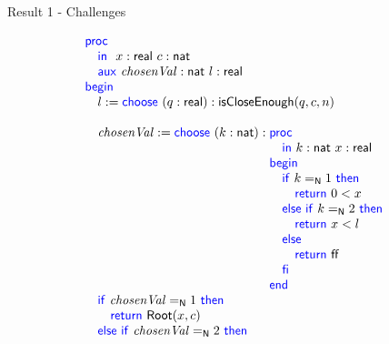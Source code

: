 \begin{frame}{Result 1 - Challenges}
\begin{minipage}[t]{0.4\linewidth}
        \pause
    \end{minipage}
    \begin{minipage}[t]{0.50\linewidth}
        \pause
        {
        \vspace{-1.5em}
        \center
        }
        \vspace{-1em}
        \scriptsize
         \[ 
            \BLOCK{             
                \PROC  \\
                    \INDENT{
                    \IN \ x:\real\ c:\nat \\
                    \AUX \chosenVal:\nat\ l:\real}\\
                \BEGIN \\
                    \INDENT{
                    l := \CHOOSE (q:\real) :
                                        \BLOCK{
                                        \isCloseEnough(q, c, n)} \\
                     \\
                    \chosenVal := \CHOOSE (k : \nat) :
                            \BLOCK{
                            \PROC \\
                                \INDENT{
                                \IN k:\nat\ x:\real}\\
                            \BEGIN \\
                                \INDENT{
                                \IF k \natEq 1 \THEN \\
                                    \INDENT{
                                    \RETURN 0<x}\\
                                \ELSE \IF k \natEq 2 \THEN \\
                                    \INDENT{
                                    \RETURN x<l}\\
                                \ELSE \\
                                    \INDENT{
                                    \RETURN \false}\\
                                \FI }\\
                            \END}\\
                    \IF \chosenVal \natEq 1 \THEN \\
                        \INDENT{
                        \RETURN \mathsf{Root}(x,c)}\\
                    \ELSE \IF \chosenVal \natEq 2 \THEN \\
}}\]
\end{minipage}
\end{frame}

